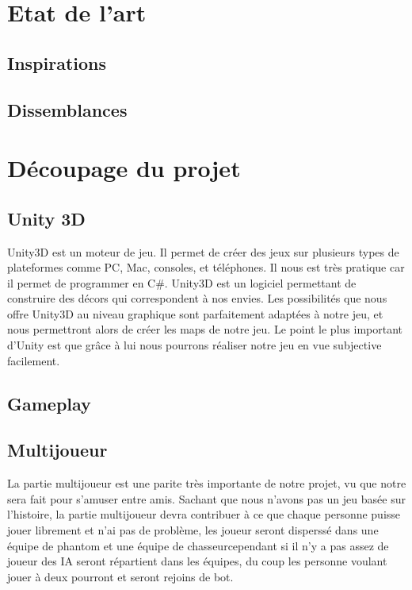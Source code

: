 \documentclass[10pt]{article} %
\begin{document}
\section{Etat de l'art}



\subsection{Inspirations}



\subsection{Dissemblances}



\section{Découpage du projet}



\subsection{Unity 3D}

Unity3D est un moteur de jeu. Il permet de créer des jeux sur plusieurs types de plateformes comme PC, Mac, consoles, et téléphones. Il nous est très pratique car il permet de programmer en C\#. Unity3D est un logiciel permettant de construire des décors qui correspondent à nos envies. Les possibilités que nous offre Unity3D au niveau graphique sont parfaitement adaptées à notre jeu, et nous permettront alors de créer les maps de notre jeu. Le point le plus important d’Unity est que grâce à lui nous pourrons réaliser notre jeu en vue subjective facilement.

\subsection{Gameplay}



\subsection{Multijoueur}

La partie multijoueur est une parite très importante de notre projet, vu que notre sera fait pour s'amuser entre amis. Sachant que nous n'avons pas un jeu basée sur l'histoire, la partie multijoueur devra contribuer à ce que chaque personne puisse jouer librement et n'ai pas de problème, les joueur seront disperssé dans une équipe de phantom et une équipe de chasseurcependant si il n'y a pas assez de joueur des IA seront répartient dans les équipes, du coup les personne voulant jouer à deux pourront et seront rejoins de bot.    
\end{document}
